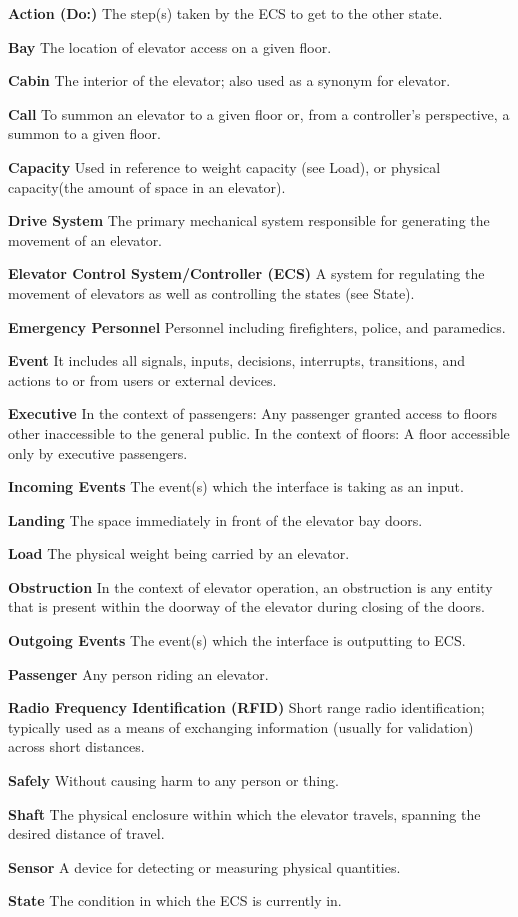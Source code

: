 \documentclass[12pt]{article}
\begin{document}
	\begin{list}{}{}
		\item{\textbf{Action (Do:)} The step(s) taken by the ECS to get to the other state.}
		\item{\textbf{Bay} The location of elevator access on a given floor.}
		\item{\textbf{Cabin} The interior of the elevator; also used as a synonym for elevator.}
		\item{\textbf{Call} To summon an elevator to a given floor or, from a controller’s perspective, a summon to a given floor.}
		\item{\textbf{Capacity} Used in reference to weight capacity (see Load), or physical capacity(the amount of space in an elevator).}
		\item{\textbf{Drive System} The primary mechanical system responsible for generating the movement of an elevator.}
		\item{\textbf{Elevator Control System/Controller (ECS)} A system for regulating the movement of elevators as well as controlling the states (see State).}
		\item{\textbf{Emergency Personnel} Personnel including firefighters, police, and paramedics.}
		\item{\textbf{Event} It includes all signals, inputs, decisions, interrupts, transitions, and actions to or from users or external devices.}
		\item{\textbf{Executive} In the context of passengers: Any passenger granted access to floors other inaccessible to the general public. In the context of floors: A floor accessible only by executive passengers.}
		\item{\textbf{Incoming Events} The event(s) which the interface is taking as an input.}
		\item{\textbf{Landing} The space immediately in front of the elevator bay doors.}
		\item{\textbf{Load} The physical weight being carried by an elevator.}
		\item{\textbf{Obstruction} In the context of elevator operation, an obstruction is any entity that is present within the doorway of the elevator during closing of the doors.}
		\item{\textbf{Outgoing Events} The event(s) which the interface is outputting to ECS.}
		\item{\textbf{Passenger} Any person riding an elevator.}
		\item{\textbf{Radio Frequency Identification (RFID)} Short range radio identification; typically used as a means of exchanging information (usually for validation) across short distances.}
		\item{\textbf{Safely} Without causing harm to any person or thing.}
		\item{\textbf{Shaft}  The physical enclosure within which the elevator travels, spanning the desired distance of travel.}
		\item{\textbf{Sensor}  A device for detecting or measuring physical quantities.}
		\item{\textbf{State}  The condition in which the ECS is currently in.}
	\end{list}


\pagebreak
\end{document}
